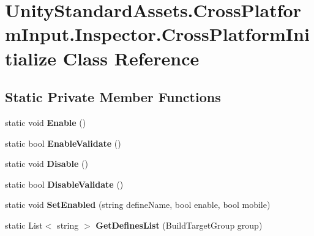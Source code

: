 \hypertarget{class_unity_standard_assets_1_1_cross_platform_input_1_1_inspector_1_1_cross_platform_initialize}{}\section{Unity\+Standard\+Assets.\+Cross\+Platform\+Input.\+Inspector.\+Cross\+Platform\+Initialize Class Reference}
\label{class_unity_standard_assets_1_1_cross_platform_input_1_1_inspector_1_1_cross_platform_initialize}
\subsection*{Static Private Member Functions}
\begin{DoxyCompactItemize}
\item 
\mbox{\label{class_unity_standard_assets_1_1_cross_platform_input_1_1_inspector_1_1_cross_platform_initialize_aa8753445f13e615b742731c137c7aa39}} 
static void {\bfseries Enable} ()
\item 
\mbox{\label{class_unity_standard_assets_1_1_cross_platform_input_1_1_inspector_1_1_cross_platform_initialize_a785ef8401d6650e93db7e285ad25a938}} 
static bool {\bfseries Enable\+Validate} ()
\item 
\mbox{\label{class_unity_standard_assets_1_1_cross_platform_input_1_1_inspector_1_1_cross_platform_initialize_a108c00b4317021552af98b607f4e8235}} 
static void {\bfseries Disable} ()
\item 
\mbox{\label{class_unity_standard_assets_1_1_cross_platform_input_1_1_inspector_1_1_cross_platform_initialize_a6cbb9e548e48ffe15818db01e2508de5}} 
static bool {\bfseries Disable\+Validate} ()
\item 
\mbox{\label{class_unity_standard_assets_1_1_cross_platform_input_1_1_inspector_1_1_cross_platform_initialize_a83009de04e35f5c6fcd741553ad33d1c}} 
static void {\bfseries Set\+Enabled} (string define\+Name, bool enable, bool mobile)
\item 
\mbox{\label{class_unity_standard_assets_1_1_cross_platform_input_1_1_inspector_1_1_cross_platform_initialize_a74ceecb766e5622625a939cbf4c6158d}} 
static List$<$ string $>$ {\bfseries Get\+Defines\+List} (Build\+Target\+Group group)
\end{DoxyCompactItemize}
